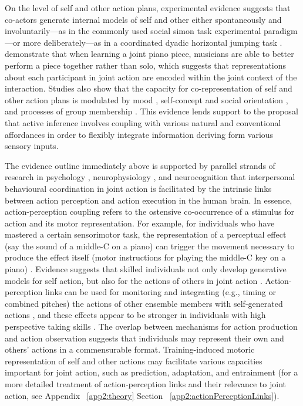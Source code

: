 \begin{CJK}{UTF8}{gbsn}
On the level of self and other action plans, experimental evidence suggests that co-actors generate internal models of self and other either spontaneously and involuntarily---as in the commonly used social simon task experimental paradigm \citep{Sebanz2003,Atmaca2008}---or more deliberately---as in a coordinated dyadic horizontal jumping task \citep{Vesper2012}.  \textcite{Loehr2016} demonstrate that when learning a joint piano piece, musicians are able to better perform a piece together rather than solo, which suggests that representations about each participant in joint action are encoded within the joint context of the interaction.  Studies also show that the capacity for co-representation of self and other action plans is modulated by mood \citep[positive or negative affect, see][]{Kuhbandner2010}, self-concept and social orientation \citep{Colzato2012,Colzato2012a}, and processes of group membership \citep{DeBruijn2008,Iani2013}. This evidence lends support to the proposal that active inference involves coupling with various natural and conventional affordances in order to flexibly integrate information deriving form various sensory inputs.

The evidence outline immediately above is supported by parallel strands of research in psychology \citep{Prinz1990,Prinz1997,Prinz2013}, neurophysiology \citep{Rizzolatti2004,Rizzolatti2010}, and neurocognition \citep{Wolpert1998,Wolpert2000} that interpersonal behavioural coordination in joint action is facilitated by the intrinsic links between action perception and action execution in the human brain.  In essence, action-perception coupling refers to the ostensive co-occurrence of a stimulus for action and its motor representation.  For example, for individuals who have mastered a certain sensorimotor task, the representation of a perceptual effect (say the sound of a middle-C on a piano) can trigger the movement necessary to produce the effect itself (motor instructions for playing the middle-C key on a piano) \citep{Novembre2014}. Evidence suggests that skilled individuals not only develop generative models for self action, but also for the actions of others in joint action \citep{Novembre2012}. Action-perception links can be used for monitoring and integrating (e.g., timing or combined pitches) the actions of other ensemble members with self-generated actions \citep{Loehr2013}, and these effects appear to be stronger in individuals with high perspective taking skills \citep{Novembre2012,Loehr2013}.  The overlap between mechanisms for action production and action observation suggests that individuals may represent their own and others’ actions in a commensurable format.  Training-induced motoric representation of self and other actions may facilitate various capacities important for joint action, such as prediction, adaptation, and entrainment (for a more detailed treatment of action-perception links and their relevance to joint action, see Appendix ~\ref{app2:theory} Section ~\ref{app2:actionPerceptionLinks}).


\end{CJK}

